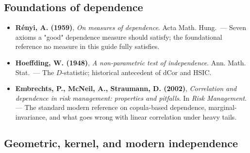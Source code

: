 \documentclass{article}
\providecommand{\tightlist}{\setlength{\itemsep}{0pt}\setlength{\parskip}{0pt}}
\begin{document}
\subsection{Foundations of dependence}\label{foundations-of-dependence}

\begin{itemize}
\tightlist
\item
  \textbf{R\'enyi, A. (1959)}, \emph{On measures of dependence}. Acta
  Math. Hung.\ --- Seven axioms a "good" dependence measure should
  satisfy; the foundational reference no measure in this guide fully
  satisfies.
\item
  \textbf{Hoeffding, W. (1948)}, \emph{A non-parametric test of
  independence}. Ann. Math. Stat.\ --- The \(D\)-statistic; historical
  antecedent of dCor and HSIC.
\item
  \textbf{Embrechts, P., McNeil, A., Straumann, D. (2002)},
  \emph{Correlation and dependence in risk management: properties and
  pitfalls}. In \emph{Risk Management}. --- The standard modern
  reference on copula-based dependence, marginal-invariance, and what
  goes wrong with linear correlation under heavy tails.
\end{itemize}

\subsection{Geometric, kernel, and modern
independence}\label{geometric-kernel-and-modern-independence}
\end{document}
